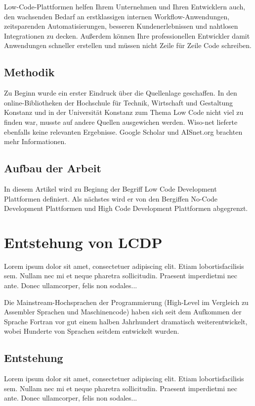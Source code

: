\documentclass{article}
\begin{document}
	Low-Code-Plattformen helfen Ihrem Unternehmen und Ihren Entwicklern auch, den wachsenden Bedarf an erstklassigen internen Workflow-Anwendungen, zeitsparenden Automatisierungen, besseren Kundenerlebnissen und nahtlosen Integrationen zu decken. Außerdem können Ihre professionellen Entwickler damit Anwendungen schneller erstellen und müssen nicht Zeile für Zeile Code schreiben.
	
	\subsection{Methodik}
	Zu Beginn wurde ein erster Eindruck über die Quellenlage geschaffen. In den online-Bibliotheken der Hochschule für Technik, Wirtschaft und Gestaltung Konstanz und in der Universität Konstanz zum Thema Low Code nicht viel zu finden war, musste auf andere Quellen ausgewichen werden. \newline
	Wiso-net lieferte ebenfalls keine relevanten Ergebnisse. 
	Google Scholar und AISnet.org brachten mehr Informationen.
	
	
	\subsection{Aufbau der Arbeit}
	In diesem Artikel wird zu Beginng der Begriff Low Code Development Plattformen definiert. 
	Als nächstes wird er von den Bergiffen No-Code Development Plattformen und High Code Development Plattformen abgegrenzt. \newline
	
	
	\section{Entstehung von LCDP}
	Lorem  ipsum  dolor  sit  amet,  consectetuer  adipiscing  
	elit.   Etiam  lobortisfacilisis sem.  Nullam nec mi et 
	neque pharetra sollicitudin.  Praesent imperdietmi nec ante. 
	Donec ullamcorper, felis non sodales...
	
	Die Mainstream-Hochsprachen der Programmierung (High-Level im Vergleich zu Assembler Sprachen und Maschinencode) haben sich seit dem Aufkommen der Sprache Fortran vor gut einem halben Jahrhundert dramatisch weiterentwickelt, wobei Hunderte von Sprachen seitdem entwickelt wurden.\cite{Margaria.2021}
	
	\subsection{Entstehung}	
	Lorem  ipsum  dolor  sit  amet,  consectetuer  adipiscing  
	elit.   Etiam  lobortisfacilisis sem.  Nullam nec mi et 
	neque pharetra sollicitudin.  Praesent imperdietmi nec ante. 
	Donec ullamcorper, felis non sodales...
	
\end{document}
